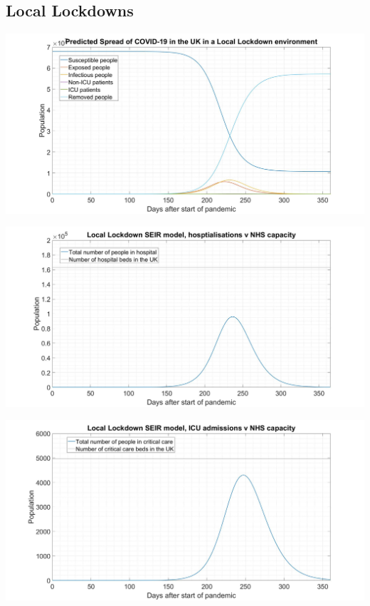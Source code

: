 \documentclass[11pt]{article}
\begin{document}
\subsection{Local Lockdowns}
\begin{center}
\includegraphics[width=1\textwidth]{LLSEIHR.jpg} 
\end{center}
\begin{center}
\includegraphics[width=1\textwidth]{LLH.jpg} 
\end{center}
\begin{center}
\includegraphics[width=1\textwidth]{LLHICU.jpg} 
\end{center}
\end{document}
